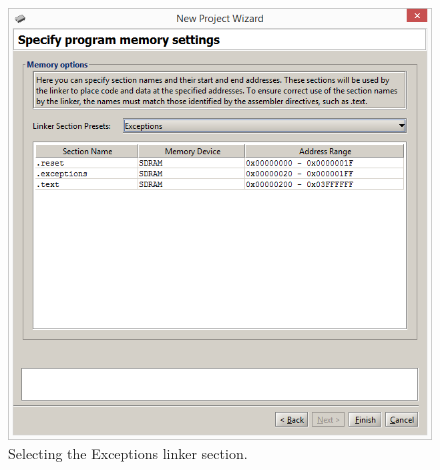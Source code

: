 \documentclass[epsfig,10pt,fullpage]{article}
\newcommand{\CommonDocsPath}{../../../../common/docs}
\begin{document}
~\\
\begin{figure}[htb]
	\begin{center}
	\includegraphics[scale=0.58]{figures/exceptions_C.png}
	\end{center}
	\vspace{-0.25cm}\caption{Selecting the {\sf Exceptions} linker section.}
\label{fig:exceptions}
\end{figure}



\end{document}
